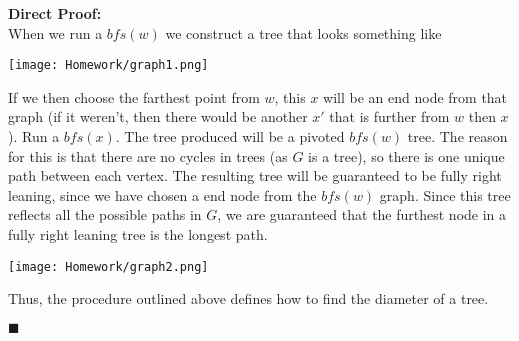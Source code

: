 \documentclass[11pt]{article}
\begin{document}
{\bf Direct Proof:}\\

When we run a $bfs(w)$ we construct a tree that looks something like
\begin{center}
\texttt{[image: Homework/graph1.png]}
\end{center}

If we then choose the farthest point from $w$, this $x$ will be an end node from that graph (if it weren't, then there would be another $x'$ that is further from $w$ then $x$). Run a $bfs(x)$. The tree produced will be a pivoted $bfs(w)$ tree. The reason for this is that there are no cycles in trees (as $G$ is a tree), so there is one unique path between each vertex. The resulting tree will be guaranteed to be fully right leaning, since we have chosen a end node from the $bfs(w)$ graph. Since this tree reflects all the possible paths in $G$, we are guaranteed that the furthest node in a fully right leaning tree is the longest path.

\begin{center}
\texttt{[image: Homework/graph2.png]}
\end{center}

Thus, the procedure outlined above defines how to find the diameter of a tree. 
\begin{flushright}$\blacksquare$\end{flushright}
\end{document}

